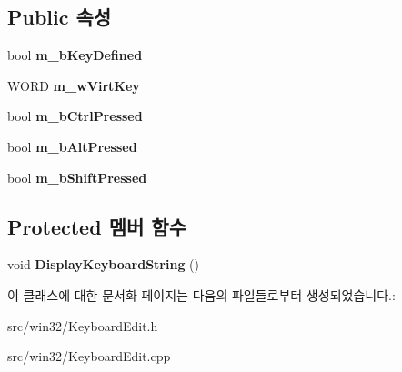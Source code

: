 \subsection*{Public 속성}
\begin{DoxyCompactItemize}
\item 
\mbox{\label{class_c_keyboard_edit_a9bf24703c8d1a3a019b43dc67c26c3a0}} 
bool {\bfseries m\+\_\+b\+Key\+Defined}
\item 
\mbox{\label{class_c_keyboard_edit_a6a4efef92e151002720d0d930db29521}} 
W\+O\+RD {\bfseries m\+\_\+w\+Virt\+Key}
\item 
\mbox{\label{class_c_keyboard_edit_a0dbb417bbaaeaa95c00fceaecd210064}} 
bool {\bfseries m\+\_\+b\+Ctrl\+Pressed}
\item 
\mbox{\label{class_c_keyboard_edit_a724b035848eeca7bebc24e1309afeb6d}} 
bool {\bfseries m\+\_\+b\+Alt\+Pressed}
\item 
\mbox{\label{class_c_keyboard_edit_ac4a4f45be9ef923961ab92a48a28f789}} 
bool {\bfseries m\+\_\+b\+Shift\+Pressed}
\end{DoxyCompactItemize}
\subsection*{Protected 멤버 함수}
\begin{DoxyCompactItemize}
\item 
\mbox{\label{class_c_keyboard_edit_a432e346d4d5285064b5e92ff4c6a0385}} 
void {\bfseries Display\+Keyboard\+String} ()
\end{DoxyCompactItemize}


이 클래스에 대한 문서화 페이지는 다음의 파일들로부터 생성되었습니다.\+:\begin{DoxyCompactItemize}
\item 
src/win32/Keyboard\+Edit.\+h\item 
src/win32/Keyboard\+Edit.\+cpp\end{DoxyCompactItemize}
